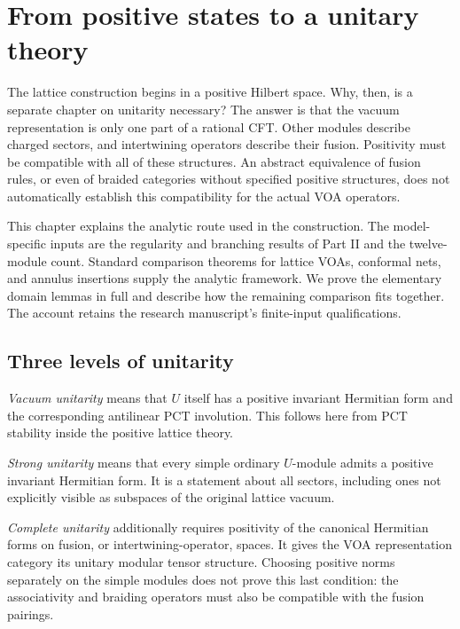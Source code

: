 \chapter{From positive states to a unitary theory}
\label{ch:unitarity}

The lattice construction begins in a positive Hilbert space. Why,
then, is a separate chapter on unitarity necessary? The answer is
that the vacuum representation is only one part of a rational CFT.
Other modules describe charged sectors, and intertwining operators
describe their fusion. Positivity must be compatible with all of
these structures. An abstract equivalence of fusion rules, or even
of braided categories without specified positive structures, does
not automatically establish this compatibility for the actual VOA
operators.

This chapter explains the analytic route used in the construction.
The model-specific inputs are the regularity and branching results
of Part II and the twelve-module count. Standard comparison theorems
for lattice VOAs, conformal nets, and annulus insertions supply the
analytic framework. We prove the elementary domain lemmas in full
and describe how the remaining comparison fits together. The account
retains the research manuscript's finite-input qualifications.

\section{Three levels of unitarity}

\emph{Vacuum unitarity} means that $U$ itself has a positive
invariant Hermitian form and the corresponding antilinear PCT
involution. This follows here from PCT stability inside the positive
lattice theory.

\emph{Strong unitarity} means that every simple ordinary $U$-module
admits a positive invariant Hermitian form. It is a statement about
all sectors, including ones not explicitly visible as subspaces of
the original lattice vacuum.

\emph{Complete unitarity} additionally requires positivity of the
canonical Hermitian forms on fusion, or intertwining-operator,
spaces. It gives the VOA representation category its unitary
modular tensor structure. Choosing positive norms separately on
the simple modules does not prove this last condition: the
associativity and braiding operators must also be compatible with
the fusion pairings.

